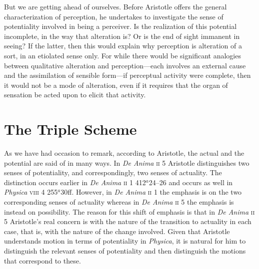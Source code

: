 But we are getting ahead of ourselves. Before Aristotle offers the general characterization of perception, he undertakes to investigate the sense of potentiality involved in being a perceiver. Is the realization of this potential incomplete, in the way that alteration is? Or is the end of sight immanent in seeing? If the latter, then this would explain why perception is alteration of a sort, in an etiolated sense only. For while there would be significant analogies between qualitative alteration and perception---each involves an external cause and the assimilation of sensible form---if perceptual activity were complete, then it would not be a mode of alteration, even if it requires that the organ of sensation be acted upon to elicit that activity.


\section{The Triple Scheme} %
\label{sec:the_triple_scheme}

As we have had occasion to remark, according to Aristotle, the actual and the potential are said of in many ways. In \emph{De Anima} \textsc{ii} 5 Aristotle distinguishes two senses of potentiality, and correspondingly, two senses of actuality. The distinction occurs earlier in \emph{De Anima} \textsc{ii} 1 412\( ^{a} \)24--26 and occurs as well in \emph{Physica} \textsc{viii} 4 255\( ^{a} \)30ff. However, in \emph{De Anima} \textsc{ii} 1 the emphasis is on the two corresponding senses of actuality whereas in \emph{De Anima} \textsc{ii} 5 the emphasis is instead on possibility. The reason for this shift of emphasis is that in \emph{De Anima} \textsc{ii} 5 Aristotle's real concern is with the nature of the transition to actuality in each case, that is, with the nature of the change involved. Given that Aristotle understands motion in terms of potentiality in \emph{Physica}, it is natural for him to distinguish the relevant senses of potentiality and then distinguish the motions that correspond to these.

